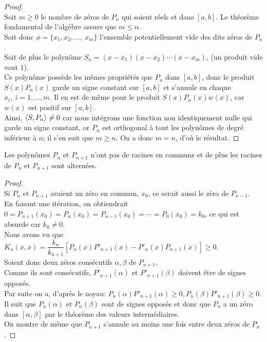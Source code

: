 \begin{proof}
$ $ \\
Soit $ m \geqslant 0$ le nombre de zéros de $P_n$ qui soient réels et dans $[a,b]$. Le théorème fondamental de l'algèbre assure que $ m \leqslant n $. 
\\Soit donc $\phi = \{x_1,x_2, \dots,\ x_m \}$ l'ensemble potentiellement vide des dits zéros de $P_n$. 
\\Soit de plus le polynôme $S_n=(x-x_1)(x-x_2) \cdots (x-x_m)$, (un produit vide vaut $1$).
\\Ce polynôme possède les mêmes propriétés que $P_n$ dans $[a,b]$, donc le produit $S(x)P_n(x)$ garde un signe constant sur $[a,b]$ et s'annule en chaque $x_i,\ i=1,\dots,m$. Il en est de même pour le produit $S(x)P_n(x)w(x)$, car $w(x)$ est positif sur $[a,b]$.
\\Ainsi, $\langle S,P_n \rangle \neq 0$ car nous intégrons une fonction non identiquement nulle qui garde un signe constant, or $P_n$ est orthogonal à tout les polynômes de degré inférieur à $n$; il s'en suit que $m \geqslant n$. On a donc $m=n$, d'où le résultat.
\end{proof}

\bthm
$ $\\
Les polynômes $P_n$ et $P_{n+1}$ n'ont pas de racines en communs et de plus les racines de $P_n$ et $P_{n+1}$ sont alternées.
\ethm

\begin{proof}
$ $\\
Si $P_n$ et $P_{n+1}$ avaient un zéro en commun, $x_0$, ce serait aussi le zéro de $P_{n-1}$.
\\En faisant une itération, on obtiendrait $0=P_{n+1}(x_0)=P_n(x_0)=P_{n-1}(x_0)=\cdots=P_0(x_0)=k_0$, ce qui est absurde car $k_0\neq 0$.
\\$ $
\\Nous avons vu que $ K_n(x,x) = \dfrac{k_n}{k_{n+1}}[P_n(x)P'_{n+1}(x)-P'_n(x)P_{n+1}(x)]\geqslant 0$.
\\Soient donc deux zéros consécutifs $\alpha,\beta $ de $P_{n+1}$. 
\\Comme ils sont consécutifs, $P'_{n+1}(\alpha)$ et $P'_{n+1}(\beta)$ doivent être de signes opposés.
\\Par suite on a, d'après le noyau:
$P_n(\alpha)P'_{n+1}(\alpha) \geqslant 0,P_n(\beta)P'_{n+1}(\beta) \geqslant 0$.
\\Il suit que $P_n(\alpha)$ et $P_n(\beta)$ sont de signes opposés et donc que $P_n$ a un zéro dans $[\alpha,\beta]$ par le théorème des valeurs intermédiaires.
\\ On montre de même que $P_{n+1}$ s'annule au moins une fois entre deux zéros de $P_n$.
\end{proof}